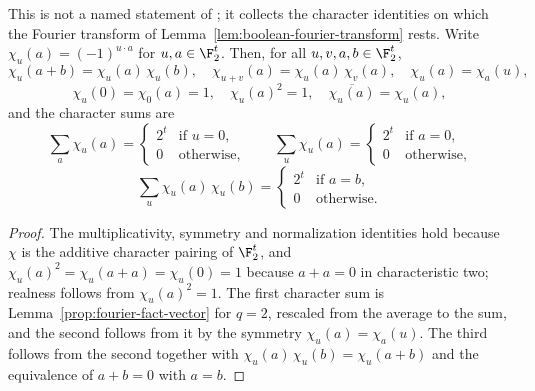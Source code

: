\begin{lemma}
	\label{lem:boolean-characters}
	\leanok
	This is not a named statement of \cite{Natarajan2017Linearity}; it collects
	the character identities on which the Fourier transform of
	Lemma~\ref{lem:boolean-fourier-transform} rests. Write
	$\chi_u(a) = (-1)^{u \cdot a}$ for $u, a \in \F_2^t$. Then, for all
	$u, v, a, b \in \F_2^t$,
	\[
		\chi_u(a + b) = \chi_u(a) \, \chi_u(b) ,
		\quad
		\chi_{u+v}(a) = \chi_u(a) \, \chi_v(a) ,
		\quad
		\chi_u(a) = \chi_a(u) ,
	\]
	\[
		\chi_u(0) = \chi_0(a) = 1 ,
		\quad
		\chi_u(a)^2 = 1 ,
		\quad
		\overline{\chi_u(a)} = \chi_u(a) ,
	\]
	and the character sums are
	\[
		\sum_a \chi_u(a) =
		\begin{cases}
			2^t & \text{if } u = 0, \\
			0 & \text{otherwise,}
		\end{cases}
		\qquad
		\sum_u \chi_u(a) =
		\begin{cases}
			2^t & \text{if } a = 0, \\
			0 & \text{otherwise,}
		\end{cases}
	\]
	\[
		\sum_u \chi_u(a) \, \chi_u(b) =
		\begin{cases}
			2^t & \text{if } a = b, \\
			0 & \text{otherwise.}
		\end{cases}
	\]
\end{lemma}
\begin{proof}
	\leanok
	The multiplicativity, symmetry and normalization identities hold because
	$\chi$ is the additive character pairing of $\F_2^t$, and
	$\chi_u(a)^2 = \chi_u(a + a) = \chi_u(0) = 1$ because $a + a = 0$ in
	characteristic two; realness follows from $\chi_u(a)^2 = 1$. The first
	character sum is Lemma~\ref{prop:fourier-fact-vector} for $q = 2$, rescaled
	from the average to the sum, and the second follows from it by the symmetry
	$\chi_u(a) = \chi_a(u)$. The third follows from the second together with
	$\chi_u(a) \, \chi_u(b) = \chi_u(a + b)$ and the equivalence of
	$a + b = 0$ with $a = b$.
\end{proof}

